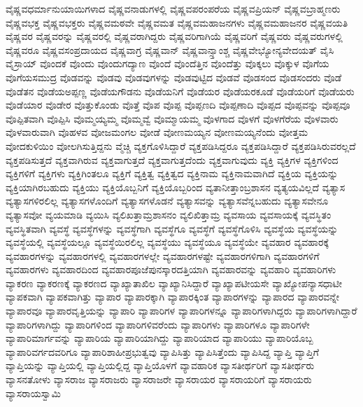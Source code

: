{ವೈಷ್ಣವಧರ್ಮಾನುಯಾಯಿಗಳಾದ
ವೈಷ್ಣವನಾಡುಗಳಲ್ಲಿ
ವೈಷ್ಣವಪರಂಪರೆಯ
ವೈಷ್ಣವಪ್ರಿಯನ್
ವೈಷ್ಣವಬ್ರಾಹ್ಮಣರು
ವೈಷ್ಣವಭಕ್ತ
ವೈಷ್ಣವಭಕ್ತರು
ವೈಷ್ಣವಮಠವೇ
ವೈಷ್ಣವಮತ
ವೈಷ್ಣವಮಹಾಜನಗಳು
ವೈಷ್ಣವಮಹಾಜನರ
ವೈಷ್ಣವಯತಿ
ವೈಷ್ಣವರ
ವೈಷ್ಣವರನ್ನು
ವೈಷ್ಣವರಲ್ಲಿ
ವೈಷ್ಣವರಾಗಿದ್ದರು
ವೈಷ್ಣವರಿಗಾಗಿಯೆ
ವೈಷ್ಣವರಿಗೆ
ವೈಷ್ಣವರು
ವೈಷ್ಣವರುಗಳಲ್ಲಿ
ವೈಷ್ಣವರೂ
ವೈಷ್ಣವಸಂಪ್ರದಾಯದ
ವೈಷ್ಣವಾಗ್ರ
ವೈಷ್ಣವಾನ್
ವೈಷ್ಣವಾನ್ಸ್ತಾಂಶ್ಚ
ವೈಷ್ಣವೇಭ್ಯೋನ್ಯವೇದಯತ್
ವೈಸಿ
ವೈಸ್ರಾಯ್
ವೊಂದಕೆ
ವೊಂದು
ವೊಂದುಗದ್ಯಾಣ
ವೊಂದೆ
ವೊಂದೆತ್ತಿನ
ವೊಂದೆತ್ತು
ವೊಕ್ಕಲು
ವೊಕ್ಕುಳ
ವೊಗೆಯ
ವೊಗೆಯಸಮುದ್ರ
ವೊಡವನ್ನು
ವೊಡವು
ವೊಡವುಗಳನ್ನು
ವೊಡವುಟ್ಟಿದ
ವೊಡವೆ
ವೊಡಸಂದ
ವೊಡಸಂದರು
ವೊಡೆ
ವೊಡೆತನ
ವೊಡೆಯಅಪ್ಪಣ್ಣ
ವೊಡೆಯಗೌಡನು
ವೊಡೆಯನಿಗೆ
ವೊಡೆಯರ
ವೊಡೆಯರಕೂಡೆ
ವೊಡೆಯರಿಗೆ
ವೊಡೆಯರು
ವೊಡೆಯಾರ
ವೊಡೇರ
ವೊತ್ತುಕೊಂಡು
ವೊತ್ತೆ
ವೊಪ
ವೊಪ್ಪ
ವೊಪ್ಪಣದಿ
ವೊಪ್ಪಣಾದಿ
ವೊಪ್ಪದ
ವೊಪ್ಪವನ್ನು
ವೊಪ್ಪವೂ
ವೊಪ್ಪಿತವಾಗಿ
ವೊಪ್ಪಿಸಿ
ವೊಮ್ಮಯ್ಯಮ್ಮ
ವೊಮ್ಮವ್ವೆ
ವೊಮ್ಮಾಯಮ್ಮ
ವೊಳಗಾದ
ವೊಳಗೆ
ವೊಳಗೆರೆಯ
ವೊಳವಾರು
ವೊಳವಾರುವಾಗಿ
ವೊಹಳವ
ವೋಜಮಂಗಲ
ವೋಡೆ
ವೋಣಮಯ್ಯನ
ವೋಣಮಯ್ಯನೆಂದು
ವೋತ್ತಮ
ವೋದಕುಳಿಯಿಂ
ವೋಲಗಿಸುತ್ತಿದ್ದನು
ವ್ಮೆಚ್ಚಿ
ವ್ಯಕ್ತಗೊಳಿಸಿದ್ದಾರೆ
ವ್ಯಕ್ತಪಡಿಸಿದ್ದರೂ
ವ್ಯಕ್ತಪಡಿಸಿದ್ದಾರೆ
ವ್ಯಕ್ತಪಡಿಸಿರುವರಲ್ಲದೆ
ವ್ಯಕ್ತಪಡಿಸುತ್ತದೆ
ವ್ಯಕ್ತವಾಗಿರುವ
ವ್ಯಕ್ತವಾಗುತ್ತದೆ
ವ್ಯಕ್ತವಾಗುತ್ತದೆಂದು
ವ್ಯಕ್ತವಾಗುವುದು
ವ್ಯಕ್ತಿ
ವ್ಯಕ್ತಿಗಳ
ವ್ಯಕ್ತಿಗಳಿಂದ
ವ್ಯಕ್ತಿಗಳಿಗೆ
ವ್ಯಕ್ತಿಗಳು
ವ್ಯಕ್ತಿಗಿಂತಲೂ
ವ್ಯಕ್ತಿಗೆ
ವ್ಯಕ್ತಿತ್ವ
ವ್ಯಕ್ತಿತ್ವದ
ವ್ಯಕ್ತಿನಾಮ
ವ್ಯಕ್ತಿನಾಮವಾಗಿದೆ
ವ್ಯಕ್ತಿಯ
ವ್ಯಕ್ತಿಯನ್ನು
ವ್ಯಕ್ತಿಯಾಗಿರಬಹುದು
ವ್ಯಕ್ತಿಯು
ವ್ಯಕ್ತಿಯೊಬ್ಬನಿಗೆ
ವ್ಯಕ್ತಿಯೊಬ್ಬರಿಂದ
ವ್ಯತಾನೀತ್ತಾಂಬ್ರಶಾಸನ
ವ್ಯತ್ಯಯವಿಲ್ಲದೆ
ವ್ಯತ್ಯಾಸ
ವ್ಯತ್ಯಾಸಗಳಿರಲಿಲ್ಲ
ವ್ಯತ್ಯಾಸಗಳೊಂದಿಗೆ
ವ್ಯತ್ಯಾಸಗಳೊಡನೆ
ವ್ಯತ್ಯಾಸವನ್ನು
ವ್ಯತ್ಯಾಸವೆನ್ನಬಹುದು
ವ್ಯತ್ಯಾಸವೇನೂ
ವ್ಯತ್ಯಾಸವೋ
ವ್ಯಯಮಾಡಿ
ವ್ಯಯಿಸಿ
ವ್ಯಲಿಖತ್ತಾಮ್ರಶಾಸನಂ
ವ್ಯಲಿಖಿತ್ತಾಮ್ರ
ವ್ಯವಸಾಯ
ವ್ಯವಸಾಯಕ್ಕೆ
ವ್ಯವಸ್ಥಿತಂ
ವ್ಯವಸ್ಥಿತವಾಗಿ
ವ್ಯವಸ್ಥೆ
ವ್ಯವಸ್ಥೆಗಳನ್ನು
ವ್ಯವಸ್ಥೆಗಾಗಿ
ವ್ಯವಸ್ಥೆಗೂ
ವ್ಯವಸ್ಥೆಗೆ
ವ್ಯವಸ್ಥೆಗೊಳಿಸಿ
ವ್ಯವಸ್ಥೆಯ
ವ್ಯವಸ್ಥೆಯನ್ನು
ವ್ಯವಸ್ಥೆಯಲ್ಲಿ
ವ್ಯವಸ್ಥೆಯಲ್ಲೂ
ವ್ಯವಸ್ಥೆಯಿರಲಿಲ್ಲ
ವ್ಯವಸ್ಥೆಯು
ವ್ಯವಸ್ಥೆಯೂ
ವ್ಯವಸ್ಥೆಯೇ
ವ್ಯವಹಾರ
ವ್ಯವಹಾರಕ್ಕೆ
ವ್ಯವಹಾರಗಳನ್ನು
ವ್ಯವಹಾರಗಳಲ್ಲಿ
ವ್ಯವಹಾರಗಳಲ್ಲೇ
ವ್ಯವಹಾರಗಳಷ್ಟೇ
ವ್ಯವಹಾರಗಳಿಗಾಗಿ
ವ್ಯವಹಾರಗಳಿಗೆ
ವ್ಯವಹಾರಗಳು
ವ್ಯವಹಾರದಿಂದ
ವ್ಯವಹಾರಪೂಜೆಪುನಸ್ಕಾರದತ್ತಿಯಾಗಿ
ವ್ಯವಹಾರವನ್ನು
ವ್ಯವಹಾರಿ
ವ್ಯವಹಾರಿಗಳು
ವ್ಯಾಕರಣ
ವ್ಯಾಕರಣಕ್ಕೆ
ವ್ಯಾಕರಣದ
ವ್ಯಾಖ್ಯಾತಾಖಿಲ
ವ್ಯಾಖ್ಯಾನಿಸಿದ್ದಾರೆ
ವ್ಯಾಖ್ಯಾಪಟೀಯಸೇ
ವ್ಯಾಖ್ಯೋಪನ್ಯಾಸಧಾಟೀ
ವ್ಯಾಪಕವಾಗಿ
ವ್ಯಾಪಕವಾಗಿತ್ತು
ವ್ಯಾಪಾರ
ವ್ಯಾಪಾರಕ್ಕಾಗಿ
ವ್ಯಾಪಾರಕ್ಕಿಂತ
ವ್ಯಾಪಾರಗಳನ್ನು
ವ್ಯಾಪಾರದ
ವ್ಯಾಪಾರವನ್ನೇ
ವ್ಯಾಪಾರವೂ
ವ್ಯಾಪಾರವೃತ್ತಿಯನ್ನು
ವ್ಯಾಪಾರಿ
ವ್ಯಾಪಾರಿಗಳ
ವ್ಯಾಪಾರಿಗಳನ್ನೂ
ವ್ಯಾಪಾರಿಗಳಾಗಿದ್ದರು
ವ್ಯಾಪಾರಿಗಳಾಗಿದ್ದಾರೆ
ವ್ಯಾಪಾರಿಗಳಾಗಿದ್ದು
ವ್ಯಾಪಾರಿಗಳಿಂದ
ವ್ಯಾಪಾರಿಗಳಿವರೆಂದು
ವ್ಯಾಪಾರಿಗಳು
ವ್ಯಾಪಾರಿಗಳೂ
ವ್ಯಾಪಾರಿಗಳೇ
ವ್ಯಾಪಾರಿಮಾರ್ಗವನ್ನು
ವ್ಯಾಪಾರಿಯ
ವ್ಯಾಪಾರಿಯಾಗಿದ್ದು
ವ್ಯಾಪಾರಿಯಾದ
ವ್ಯಾಪಾರಿಯು
ವ್ಯಾಪಾರಿಯೊಬ್ಬ
ವ್ಯಾಪಾರಿವರ್ಗದವರಿಗೂ
ವ್ಯಾಪಾರಿಶಾಹೀಪ್ರಭುತ್ವವು
ವ್ಯಾಪಿಸಿತ್ತು
ವ್ಯಾಪಿಸಿತ್ತೆಂದು
ವ್ಯಾಪಿಸಿದ್ದ
ವ್ಯಾಪ್ತಿ
ವ್ಯಾಪ್ತಿಗೆ
ವ್ಯಾಪ್ತಿಯನ್ನು
ವ್ಯಾಪ್ತಿಯಲ್ಲಿ
ವ್ಯಾಪ್ತಿಯಲ್ಲಿದ್ದ
ವ್ಯಾಪ್ತಿಯೊಳಗೆ
ವ್ಯಾವಹಾರಿಕ
ವ್ಯಾಸತೀರ್ಥರಿಗೆ
ವ್ಯಾಸತೀರ್ಥರು
ವ್ಯಾಸನತೋಳು
ವ್ಯಾಸರಾಜ
ವ್ಯಾಸರಾಜರು
ವ್ಯಾಸರಾಜರೇ
ವ್ಯಾಸರಾಯರ
ವ್ಯಾಸರಾಯರಿಗೆ
ವ್ಯಾಸರಾಯರು
ವ್ಯಾಸರಾಯಸ್ವಾಮಿ
}
